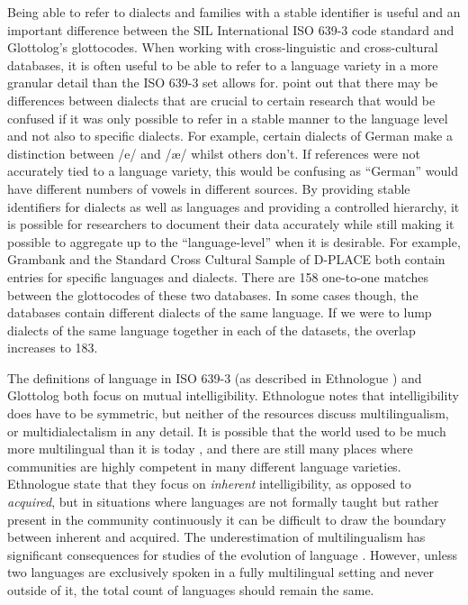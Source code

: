 \documentclass[a4paper,10pt]{article} %
\begin{document}

Being able to refer to dialects and families with a stable identifier is useful and an important difference between the SIL International ISO 639-3 code standard and Glottolog's glottocodes. When working with cross-linguistic and cross-cultural databases, it is often useful to be able to refer to a language variety in a more granular detail than the ISO 639-3 set allows for. \citet{nordhoff2011glottolog} point out that there may be differences between dialects that are crucial to certain research that would be confused if it was only possible to refer in a stable manner to the language level and not also to specific dialects. For example, certain dialects of German make a distinction between /e\textipa{:}/ and /æ\textipa{:}/ whilst others don't. If references were not accurately tied to a language variety, this would be confusing as ``German'' would have different numbers of vowels in different sources. By providing stable identifiers for dialects as well as languages and providing a controlled hierarchy, it is possible for researchers to document their data accurately while still making it possible to aggregate up to the ``language-level'' when it is desirable. For example, Grambank and the Standard Cross Cultural Sample of D-PLACE both contain entries for specific languages and dialects. There are 158 one-to-one matches between the glottocodes of these two databases. In some cases though, the databases contain different dialects of the same language. If we were to lump dialects of the same language together in each of the datasets, the overlap increases to 183.

The definitions of language in ISO 639-3 (as described in Ethnologue \citep{ethnologue2019lgident}) and Glottolog both focus on mutual intelligibility. Ethnologue notes that intelligibility does have to be symmetric, but neither of the resources discuss multilingualism, or multidialectalism in any detail. It is possible that the world used to be much more multilingual than it is today \citep{evans2017did}, and there are still many places where communities are highly competent in many different language varieties. Ethnologue state that they focus on \emph{inherent} intelligibility, as opposed to \emph{acquired}, but in situations where languages are not formally taught but rather present in the community continuously it can be difficult to draw the boundary between inherent and acquired. The underestimation of multilingualism has significant consequences for studies of the evolution of language \citep{roberts2013evolutionary}. However, unless two languages are exclusively spoken in a fully multilingual setting and never outside of it, the total count of languages should remain the same. 
\end{document}
